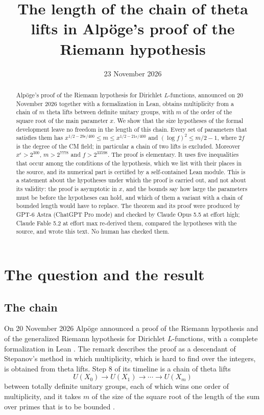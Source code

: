 \documentclass[11pt]{amsart}
\title[The length of the chain of theta lifts]{The length of the chain of theta lifts in Alp\"oge's proof of the Riemann hypothesis}
\author{}
\date{23 November 2026}
\theoremstyle{definition}
\theoremstyle{remark}
\begin{document}
\begin{abstract}
Alp\"oge's proof of the Riemann hypothesis for Dirichlet $L$-functions, announced on 20 November 2026 together with a formalization in Lean, obtains multiplicity from a chain of $m$ theta lifts between definite unitary groups, with $m$ of the order of the square root of the main parameter $x$. We show that the size hypotheses of the formal development leave no freedom in the length of this chain. Every set of parameters that satisfies them has $x^{1/2-29\epsilon/400}\le m\le x^{1/2-21\epsilon/400}$ and $(\log f)^2\le m/2-1$, where $2f$ is the degree of the CM field; in particular a chain of two lifts is excluded. Moreover $x^\epsilon>2^{300}$, $m>2^{7778}$ and $f>2^{33598}$. The proof is elementary. It uses five inequalities that occur among the conditions of the hypothesis, which we list with their places in the source, and its numerical part is certified by a self-contained Lean module. This is a statement about the hypotheses under which the proof is carried out, and not about its validity: the proof is asymptotic in $x$, and the bounds say how large the parameters must be before the hypotheses can hold, and which of them a variant with a chain of bounded length would have to replace. The theorem and its proof were produced by GPT-6 Astra (ChatGPT Pro mode) and checked by Claude Opus 5.5 at effort high; Claude Fable 5.2 at effort max re-derived them, compared the hypotheses with the source, and wrote this text. No human has checked them.
\end{abstract}

\maketitle

\section{The question and the result}

\subsection{The chain}
On 20 November 2026 Alp\"oge announced a proof of the Riemann hypothesis and of the generalized Riemann hypothesis for Dirichlet $L$-functions, with a complete formalization in Lean \cite{remark,archive}. The remark describes the proof as a descendant of Stepanov's method in which multiplicity, which is hard to find over the integers, is obtained from theta lifts. Step 8 of its timeline is a chain of theta lifts
\[
 U(X_0)\longrightarrow U(X_1)\longrightarrow\cdots\longrightarrow U(X_m)
\]
between totally definite unitary groups, each of which wins one order of multiplicity, and it takes $m$ of the size of the square root of the length of the sum over primes that is to be bounded \cite[pp.~1 and 4]{remark}.
\end{document}
